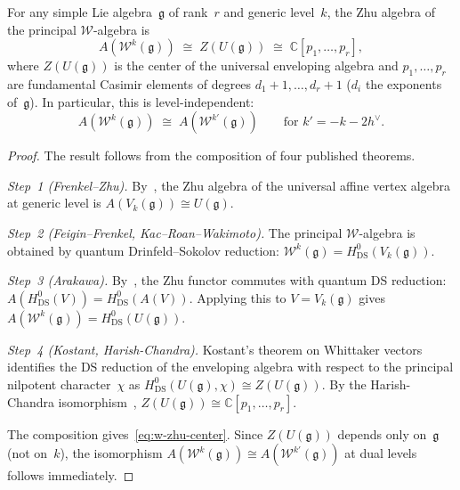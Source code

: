 \begin{theorem}
\label{thm:w-algebra-zhu-koszul}
For any simple Lie algebra~$\mathfrak{g}$ of rank~$r$ and generic level~$k$,
the Zhu algebra of the principal $\mathcal{W}$-algebra is
\begin{equation}\label{eq:w-zhu-center}
A(\mathcal{W}^k(\mathfrak{g}))
  \;\cong\; Z(U(\mathfrak{g}))
  \;\cong\; \mathbb{C}[p_1, \ldots, p_r],
\end{equation}
where $Z(U(\mathfrak{g}))$ is the center of the universal enveloping
algebra and $p_1, \ldots, p_r$ are fundamental Casimir elements of
degrees $d_1 + 1, \ldots, d_r + 1$ \textup{(}$d_i$ the exponents
of~$\mathfrak{g}$\textup{)}.  In particular, this is level-independent:
\[
A(\mathcal{W}^k(\mathfrak{g}))
  \;\cong\; A(\mathcal{W}^{k'}(\mathfrak{g}))
  \qquad \text{for } k' = -k - 2h^\vee.
\]
\end{theorem}

\begin{proof}
The result follows from the composition of four published theorems.

\emph{Step~1 (Frenkel--Zhu).}
By~\cite{FZ92}, the Zhu algebra of the universal affine vertex algebra at
generic level is $A(V_k(\mathfrak{g})) \cong U(\mathfrak{g})$.

\emph{Step~2 (Feigin--Frenkel, Kac--Roan--Wakimoto).}
The principal $\mathcal{W}$-algebra is obtained by quantum Drinfeld--Sokolov
reduction: $\mathcal{W}^k(\mathfrak{g}) = H^0_{\mathrm{DS}}(V_k(\mathfrak{g}))$.

\emph{Step~3 (Arakawa).}
By~\cite{Ara07}, the Zhu functor commutes with quantum DS reduction:
$A(H^0_{\mathrm{DS}}(V)) = H^0_{\mathrm{DS}}(A(V))$.
Applying this to $V = V_k(\mathfrak{g})$ gives
$A(\mathcal{W}^k(\mathfrak{g})) = H^0_{\mathrm{DS}}(U(\mathfrak{g}))$.

\emph{Step~4 (Kostant, Harish-Chandra).}
Kostant's theorem on Whittaker vectors~\cite{Kostant78} identifies
the DS reduction of the enveloping algebra with respect to the
principal nilpotent character~$\chi$ as
$H^0_{\mathrm{DS}}(U(\mathfrak{g}), \chi) \cong Z(U(\mathfrak{g}))$.
By the Harish-Chandra isomorphism~\cite{HarishChandra},
$Z(U(\mathfrak{g})) \cong \mathbb{C}[p_1, \ldots, p_r]$.

The composition gives~\eqref{eq:w-zhu-center}.  Since
$Z(U(\mathfrak{g}))$ depends only on~$\mathfrak{g}$ (not on~$k$), the
isomorphism $A(\mathcal{W}^k(\mathfrak{g})) \cong A(\mathcal{W}^{k'}(\mathfrak{g}))$
at dual levels follows immediately.
\end{proof}

